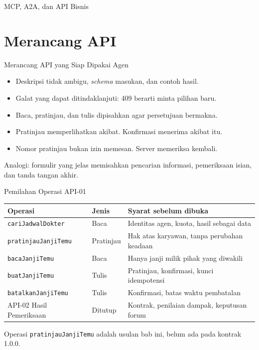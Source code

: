 \documentclass[aspectratio=169, table, 12pt]{beamer}
\begin{document}
\begin{frame}{{\Large MCP, A2A, dan API Bisnis}}
  \centering
\end{frame}

\section{Merancang API}

\begin{frame}{{\Large Merancang API yang Siap Dipakai Agen}}
  \vspace{8pt}
  \begin{itemize}
    \item Deskripsi tidak ambigu, \textit{schema} masukan, dan contoh hasil.
    \item Galat yang dapat ditindaklanjuti: 409 berarti minta pilihan baru.
    \item Baca, pratinjau, dan tulis dipisahkan agar persetujuan bermakna.
    \item Pratinjau memperlihatkan akibat. Konfirmasi menerima akibat itu.
    \item Nomor pratinjau bukan izin memesan. Server memeriksa kembali.
  \end{itemize}
  \vspace{6pt}
  {\small Analogi: formulir yang jelas memisahkan pencarian informasi, pemeriksaan isian, dan tanda tangan akhir.}
\end{frame}

\begin{frame}{{\Large Pemilahan Operasi API-01}}
  \footnotesize
  \begin{tabularx}{\textwidth}{>{\raggedright\arraybackslash}p{3.6cm} >{\raggedright\arraybackslash}p{1.6cm} >{\raggedright\arraybackslash}X}
    \hline
    \textbf{Operasi} & \textbf{Jenis} & \textbf{Syarat sebelum dibuka} \\ \hline
    \texttt{cariJadwalDokter} & Baca & Identitas agen, kuota, hasil sebagai data \\ \hline
    \texttt{pratinjauJanjiTemu} & Pratinjau & Hak atas karyawan, tanpa perubahan keadaan \\ \hline
    \texttt{bacaJanjiTemu} & Baca & Hanya janji milik pihak yang diwakili \\ \hline
    \texttt{buatJanjiTemu} & Tulis & Pratinjau, konfirmasi, kunci idempotensi \\ \hline
    \texttt{batalkanJanjiTemu} & Tulis & Konfirmasi, batas waktu pembatalan \\ \hline
    API-02 Hasil Pemeriksaan & Ditutup & Kontrak, penilaian dampak, keputusan forum \\ \hline
  \end{tabularx}

  \vspace{6pt}
  \small Operasi \texttt{pratinjauJanjiTemu} adalah usulan bab ini, belum ada pada kontrak 1.0.0.
\end{frame}
\end{document}

